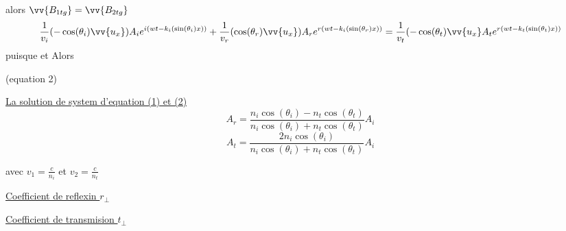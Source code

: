 \documentclass[12pt]{book}
\begin{document}
                    alors $\vv{B_{1tg}}=\vv{B_{2tg}}$\\
                    \[ \frac{1}{v_i}(-\cos(\theta_i)\vv{u_x})A_ie^{i(wt-k_i(\sin(\theta_i)x))} +  \frac{1}{v_r}(\cos(\theta_r)\vv{u_x})A_re^{r(wt-k_i(\sin(\theta_r)x))}  =  \frac{1}{v_t}(-\cos(\theta_t)\vv{u_x}A_te^{r(wt-k_t(\sin(\theta_t)x))}\]
                    puisque  et  Alors \\
                \begin{center}
                     (equation 2)
                \end{center}
                \underline{La solution de system d'equation (1) et (2)} 
                    \[ A_r = \frac{n_i\cos(\theta_i) -n_t\cos(\theta_t)}{n_i\cos(\theta_i) +n_t\cos(\theta_t)}A_i \]
                    \[ A_t = \frac{2n_i\cos(\theta_i)}{n_i\cos(\theta_i) +n_t\cos(\theta_t)}A_i \]
                \begin{center}
                    avec $v_1 = \frac{c}{n_i}$ et $v_2 = \frac{c}{n_t}$
                \end{center}
                \underline{Coefficient de reflexin $r_\perp$}
                \begin{center}
                \end{center}
                \underline{Coefficient de transmision $t_\perp$}
                \begin{center}
                \end{center}
\end{document}
